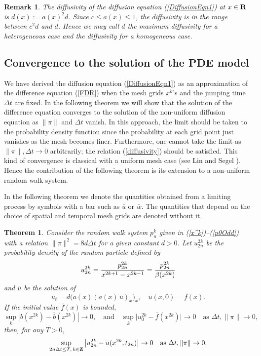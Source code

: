 \documentclass[11pt]{amsart}
\def\R{{\bf R}}
\def\d{d}
\def\R{{\bf R}}
\def\Z{{\bf Z}}
\newtheorem{theorem}{Theorem}[section]
\newtheorem{remark}{Remark}[section]
\begin{document}
\begin{remark}
The diffusivity of the diffusion equation (\ref{DiffusionEqn1}) at $x\in\R$ is $d(x):=a(x)^2\d$. Since $c\le a(x)\le1$, the diffusivity is in the range between $c^2\d$ and $\d$. Hence we may call $\d$ the maximum diffusivity for a heterogeneous case and the diffusivity for a homogeneous case.
\end{remark}



\subsection{Convergence to the solution of the PDE model}

We have derived the diffusion equation (\ref{DiffusionEqn1}) as an approximation of the difference equation (\ref{FDR}) when the mesh grids $x^k$'s and the jumping time $\Delta t$ are fixed. In the following theorem we will show that the solution of the difference equation converges to the solution of the non-uniform diffusion equation as $\|\pi\|$ and $\Delta t$ vanish. In this approach, the limit should be taken to the probability density function since the probability at each grid point just vanishes as the mesh becomes finer. Furthermore, one cannot take the limit as $\|\pi\|,\Delta t\to0$ arbitrarily; the relation (\ref{diffusivity}) should be satisfied. This kind of convergence is classical with a uniform mesh case (see Lin and Segel \cite[Section 3.3]{MR982711}). Hence the contribution of the following theorem is its extension to a non-uniform random walk system.

In the following theorem we denote the quantities obtained from a limiting process by symbols with a bar such as $\bar u$ or $\bar w$. The quantities that depend on the choice of spatial and temporal mesh grids are denoted without it.
\begin{theorem}\label{thm1} Consider the random walk system $p_n^k$ given in (\ref{x^k})--(\ref{p0Odd}) with a relation $\|\pi\|^2=8\d\Delta t$ for a given constant $\d>0$. Let $u_{2n}^{2k}$ be the probability density of the random particle defined by
$$
u_{2n}^{2k}={p_{2n}^{2k}\over x^{2k+1}-x^{2k-1}}={p_{2n}^{2k}\over\beta(x^{2k})}
$$
and $\bar u$ be the solution of
\begin{equation}\label{DiffusionEqn2}
\bar u_t=\d\big(a(x) (a(x)\,\bar u)_x \big)_x,\quad\bar u(x,0)=\bar f(x).
\end{equation}
If the initial value $\bar f(x)$ is bounded,
\begin{equation}\label{Assumptions}
\sup_k | b(x^{2k})-\bar b(x^{2k}) | \to 0, \quad\text{and}\quad
\sup_k \Big| u^{2k}_0 -\bar f(x^{2k}) \Big| \to 0 \quad \text{as $\Delta t,\|\pi\|\to 0$,}
\end{equation}
then, for any $T>0$,
\[
\sup_{2n\Delta t\leq T,\,k\in\Z} \big| u^{2k}_{2n} - \bar u(x^{2k},t_{2n}) \big| \to 0 \quad \text{as $\Delta t, \|\pi\| \to 0.$}
\]
\end{theorem}
\end{document}
